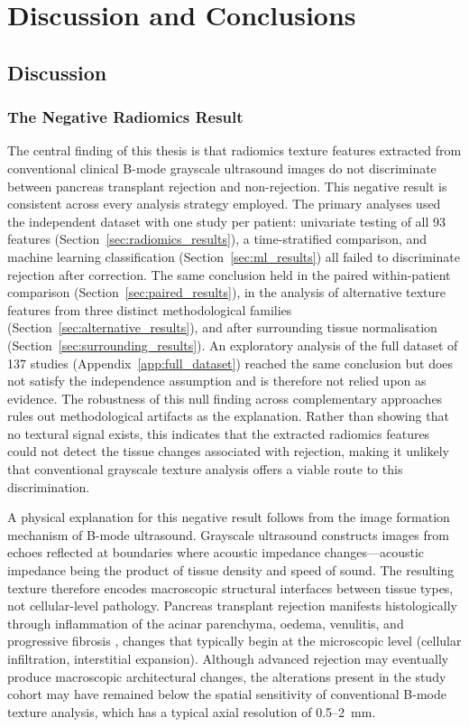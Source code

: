 \chapter{Discussion and Conclusions}

\section{Discussion}
\label{sec:discussion}

\subsection{The Negative Radiomics Result}

The central finding of this thesis is that radiomics texture features extracted from conventional clinical B-mode grayscale ultrasound images do not discriminate between pancreas transplant rejection and non-rejection. This negative result is consistent across every analysis strategy employed. The primary analyses used the independent dataset with one study per patient: univariate testing of all 93 features (Section~\ref{sec:radiomics_results}), a time-stratified comparison, and machine learning classification (Section~\ref{sec:ml_results}) all failed to discriminate rejection after correction. The same conclusion held in the paired within-patient comparison (Section~\ref{sec:paired_results}), in the analysis of alternative texture features from three distinct methodological families (Section~\ref{sec:alternative_results}), and after surrounding tissue normalisation (Section~\ref{sec:surrounding_results}). An exploratory analysis of the full dataset of 137 studies (Appendix~\ref{app:full_dataset}) reached the same conclusion but does not satisfy the independence assumption and is therefore not relied upon as evidence. The robustness of this null finding across complementary approaches rules out methodological artifacts as the explanation. Rather than showing that no textural signal exists, this indicates that the extracted radiomics features could not detect the tissue changes associated with rejection, making it unlikely that conventional grayscale texture analysis offers a viable route to this discrimination.

A physical explanation for this negative result follows from the image formation mechanism of B-mode ultrasound. Grayscale ultrasound constructs images from echoes reflected at boundaries where acoustic impedance changes---acoustic impedance being the product of tissue density and speed of sound. The resulting texture therefore encodes macroscopic structural interfaces between tissue types, not cellular-level pathology. Pancreas transplant rejection manifests histologically through inflammation of the acinar parenchyma, oedema, venulitis, and progressive fibrosis \cite{drachenberg2008, niederhaus2013}, changes that typically begin at the microscopic level (cellular infiltration, interstitial expansion). Although advanced rejection may eventually produce macroscopic architectural changes, the alterations present in the study cohort may have remained below the spatial sensitivity of conventional B-mode texture analysis, which has a typical axial resolution of 0.5--2~mm.

